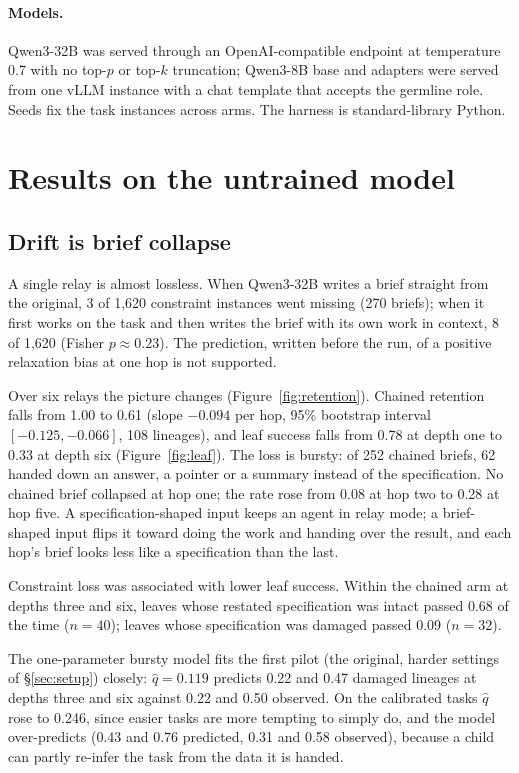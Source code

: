 \documentclass[11pt]{article}
\newcommand{\germ}{\textsf{germline}}
\begin{document}
\paragraph{Models.} Qwen3-32B was served through an OpenAI-compatible endpoint at temperature 0.7 with no top-$p$ or top-$k$ truncation; Qwen3-8B base and adapters were served from one vLLM instance with a chat template that accepts the \germ{} role. Seeds fix the task instances across arms. The harness is standard-library Python.

\section{Results on the untrained model}\label{sec:results}

\subsection{Drift is brief collapse}

A single relay is almost lossless. When Qwen3-32B writes a brief straight from the original, 3 of 1,620 constraint instances went missing (270 briefs); when it first works on the task and then writes the brief with its own work in context, 8 of 1,620 (Fisher $p\approx0.23$). The prediction, written before the run, of a positive relaxation bias at one hop is not supported.

Over six relays the picture changes (Figure~\ref{fig:retention}). Chained retention falls from 1.00 to 0.61 (slope $-0.094$ per hop, 95\% bootstrap interval $[-0.125,-0.066]$, 108 lineages), and leaf success falls from 0.78 at depth one to 0.33 at depth six (Figure~\ref{fig:leaf}). The loss is bursty: of 252 chained briefs, 62 handed down an answer, a pointer or a summary instead of the specification. No chained brief collapsed at hop one; the rate rose from 0.08 at hop two to 0.28 at hop five. A specification-shaped input keeps an agent in relay mode; a brief-shaped input flips it toward doing the work and handing over the result, and each hop's brief looks less like a specification than the last.

Constraint loss was associated with lower leaf success. Within the chained arm at depths three and six, leaves whose restated specification was intact passed 0.68 of the time ($n=40$); leaves whose specification was damaged passed 0.09 ($n=32$).

The one-parameter bursty model fits the first pilot (the original, harder settings of \S\ref{sec:setup}) closely: $\hat q=0.119$ predicts 0.22 and 0.47 damaged lineages at depths three and six against 0.22 and 0.50 observed. On the calibrated tasks $\hat q$ rose to 0.246, since easier tasks are more tempting to simply do, and the model over-predicts (0.43 and 0.76 predicted, 0.31 and 0.58 observed), because a child can partly re-infer the task from the data it is handed.
\end{document}
